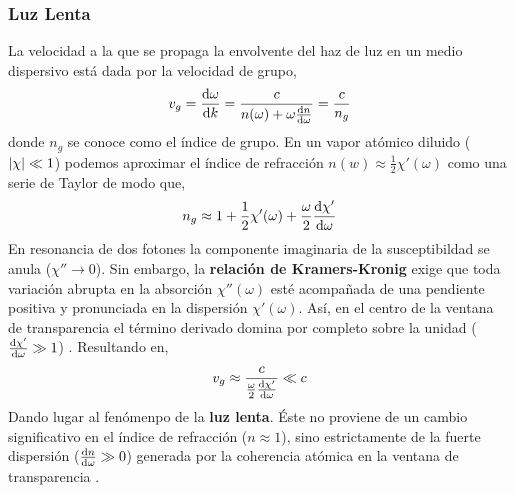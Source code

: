 \subsubsection*{Luz Lenta}
La velocidad a la que se propaga la envolvente del haz de luz en un medio dispersivo está dada por la velocidad de grupo,
\begin{equation*}
v_g = \dv{\omega}{k} = \frac{c}{n(\omega) + \omega \dv{n}{\omega}} = \frac{c}{n_g}
\end{equation*}
donde $n_g$ se conoce como el índice de grupo. En un vapor atómico diluido ($\abs{\chi} \ll 1$) podemos aproximar el índice de refracción $n(w) \approx  \frac{1}{2} \chi' (\omega)$ como una serie de Taylor de modo que,
\begin{equation*}
    n_g \approx 1 + \frac{1}{2}\chi'(\omega) + \frac{\omega}{2} \dv{\chi'}{\omega}
\end{equation*} 
En resonancia de dos fotones la componente imaginaria de la susceptibildad se anula ($\chi'' \to 0$). Sin embargo, la \textbf{relación de Kramers-Kronig} exige que toda variación abrupta en la absorción $\chi''(\omega)$ esté acompañada de una pendiente positiva y pronunciada en la dispersión $\chi'(\omega)$. Así, en el centro de la ventana de transparencia el término derivado domina por completo sobre la unidad ($\dv{\chi'}{\omega} \gg 1$) \cite{lukinControllingPhotonsUsing2001,fleischhauerElectromagneticallyInducedTransparency2005}. Resultando en,
\begin{equation}
    v_g \approx \frac{c}{\frac{\omega}{2}\dv{\chi'}{\omega}} \ll c
\end{equation}
Dando lugar al fenómenpo de la \textbf{luz lenta}. Éste no proviene de un cambio significativo en el índice de refracción  ($n \approx 1$), sino estrictamente de la fuerte dispersión ($\dv{n}{\omega} \gg 0$) generada por la coherencia atómica en la ventana de transparencia \cite{hauLightSpeedReduction1999,kashUltraslowGroupVelocity1999,phillipsStorageLightAtomic2001}.